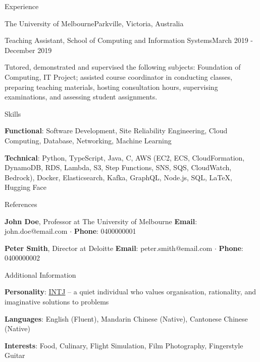 \documentclass{cv}
\begin{document}
\begin{cvsection}{Experience}
\begin{cvheading}{The University of Melbourne}{Parkville, Victoria, Australia}
\begin{cvsubheading}{Teaching Assistant, School of Computing and Information Systems}{March 2019 - December 2019}
\item Tutored, demonstrated and supervised the following subjects: Foundation of Computing, IT Project; assisted course coordinator in conducting classes, preparing teaching materials, hosting consultation hours, supervising examinations, and assessing student assignments.
\end{cvsubheading}
\end{cvheading}

\end{cvsection}

\begin{cvsection}{Skills}
\item \textbf{Functional}: Software Development, Site Reliability Engineering, Cloud Computing, Database, Networking, Machine Learning
\item \textbf{Technical}: Python, TypeScript, Java, C, AWS (EC2, ECS, CloudFormation, DynamoDB, RDS, Lambda, S3, Step Functions, SNS, SQS, CloudWatch, Bedrock), Docker, Elasticsearch, Kafka, GraphQL, Node.js, SQL, \LaTeX, Hugging Face
\end{cvsection}

\pagebreak

\begin{cvsection}{References}
\item \textbf{John Doe}, Professor at The University of Melbourne \newline
\textbf{Email}: john.doe@email.com $\cdot$ \textbf{Phone}: 0400000001
\item \textbf{Peter Smith}, Director at Deloitte \newline
\textbf{Email}: peter.smith@email.com $\cdot$ \textbf{Phone}: 0400000002
\end{cvsection}

\begin{cvsection}{Additional Information}
\item \textbf{Personality}: \href{https://www.16personalities.com/intj-personality}{INTJ} -- a quiet individual who values organisation, rationality, and imaginative solutions to problems
\item \textbf{Languages}: English (Fluent), Mandarin Chinese (Native), Cantonese Chinese (Native)
\item \textbf{Interests}: Food, Culinary, Flight Simulation, Film Photography, Fingerstyle Guitar
\end{cvsection}
\end{document}
